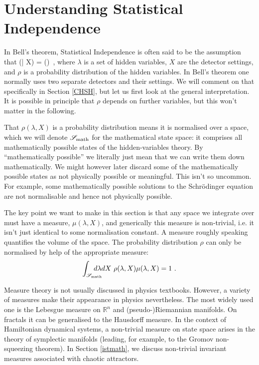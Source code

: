 \documentclass[12pt]{article}
\makeatletter
\newcommand\be{\@ifstar{\[}{\begin{equation}}}
\newcommand\ee{\@ifstar{\]}{\end{equation}}}
\makeatother
\begin{document}
\section{Understanding Statistical Independence}
\label{general} 

In Bell's theorem, Statistical Independence
is often said to be the assumption that
\be
\label{SI2}
\rho (\lambda | X) = \rho(\lambda)~,
\ee
where $\lambda$ is a set of hidden variables, $X$ are the detector settings, and $\rho$ is a probability distribution of the hidden variables. In Bell's theorem one normally uses two separate detectors and their settings. We will comment on that specifically in Section \ref{CHSH}, but let us first look at the general interpretation. It is possible in principle that $\rho$ depends on further variables, but this won't matter in the following.

That $\rho(\lambda,X)$ is a probability distribution means it is normalised over a space, which we will denote ${\mathscr S}_{\rm math}$ for the mathematical state space: it comprises all mathematically possible states of the hidden-variables theory. By ``mathematically possible'' we literally just mean that we can write them down mathematically. We might however later discard some of the mathematically possible states as not physically possible or meaningful. This isn't so uncommon. For example, some mathematically possible solutions to the Schr\"odinger equation are not normalisable and hence not physically possible. 

The key point we want to make in this section is that any space we integrate over must have a measure, $\mu(\lambda,X)$, and generically this measure is non-trivial, i.e. it isn't just identical to some normalisation constant. A measure roughly speaking quantifies the volume of the space. The probability distribution $\rho$ can only be normalised by help of the appropriate measure:
\begin{equation}
\int_{{\mathscr S}_{\rm math}} \hspace*{-0.5cm} d\lambda dX~ \rho(\lambda, X) \mu(\lambda,X) = 1~.
\end{equation}

Measure theory \cite{MeasureTheory} is not usually discussed in physics textbooks. However, a variety of measures make their appearance in physics nevertheless. The most widely used one is the Lebesgue measure on ${\mathbb R}^n$ and (pseudo-)Riemannian manifolds. On fractals it can be generalised to the Hausdorff measure. In the context of Hamiltonian dynamical systems, a non-trivial measure on state space arises in the theory of symplectic manifolds (leading, for example, to the Gromov non-squeezing theorem). In Section \ref{istmath}, we discuss non-trivial invariant measures associated with chaotic attractors. 
\end{document}
